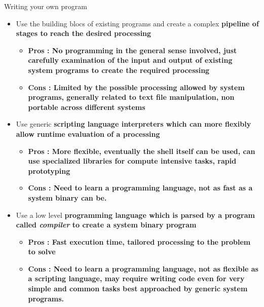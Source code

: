 \documentclass[unknownkeysallowed, 10pt, a4 paper, handout]{beamer}
\begin{document}
\begin{frame}[label=programming]{Writing your own program}
  \begin{itemize}
    \item Use the building blocs of existing programs and create a complex
      \bf{pipeline} of stages to reach the desired processing
      \begin{itemize}
        \item \bf{Pros} : No programming in the general sense involved,
          just carefully examination of the input and output of existing
          system programs to create the required processing
        \item \bf{Cons} : Limited by the possible processing allowed by
          system programs, generally related to text file manipulation,
          non portable across different systems
      \end{itemize}
    \item Use generic \bf{scripting language} interpreters which can more
      flexibly allow runtime evaluation of a processing
      \begin{itemize}
        \item \bf{Pros} : More flexible, eventually the shell itself can be
          used, can use specialized libraries for compute intensive tasks,
          rapid prototyping
        \item \bf{Cons} : Need to learn a programming language, not as fast as
          a system binary can be.
      \end{itemize}
    \item Use a low level \bf{programming language} which is parsed by a
      program called \textit{compiler} to create a system binary program
      \begin{itemize}
        \item \bf{Pros} : Fast execution time, tailored processing to the
          problem to solve
        \item \bf{Cons} : Need to learn a programming language, not as
          flexible as a scripting language, may require writing code even
          for very simple and common tasks best approached by generic 
          system programs.
      \end{itemize}
  \end{itemize}
\end{frame}
\end{document}
